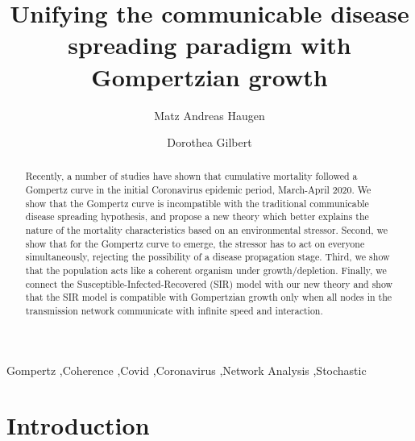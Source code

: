 \documentclass[review]{elsarticle}
\begin{document}
\begin{frontmatter}

\title{Unifying the communicable disease spreading paradigm with Gompertzian growth}


\author[mymainaddress]{Matz Andreas Haugen}

\author[mymainaddress]{Dorothea Gilbert}

\address[mymainaddress]{Independent Researcher, Oslo, Norway}

\begin{abstract}
Recently, a number of studies have shown that cumulative mortality followed a Gompertz curve in the initial Coronavirus epidemic period, March-April 2020. 
We show that the Gompertz curve is incompatible with the traditional communicable disease spreading hypothesis, and propose a new theory which better explains the nature of the mortality characteristics based on an environmental stressor. 
Second, we show that for the Gompertz curve to emerge, the stressor has to act on everyone simultaneously, rejecting the possibility of a disease propagation stage. 
Third, we show that the population acts like a coherent organism under growth/depletion. 
Finally, we connect the Susceptible-Infected-Recovered (SIR) model with our new theory and show that the SIR model is compatible with Gompertzian growth only when all nodes in the transmission network communicate with infinite speed and interaction.
\end{abstract}

\begin{keyword}
Gompertz \sep Coherence \sep Covid \sep Coronavirus \sep Network Analysis \sep Stochastic
\end{keyword}

\end{frontmatter}

\linenumbers

\section{Introduction}
\end{document}
